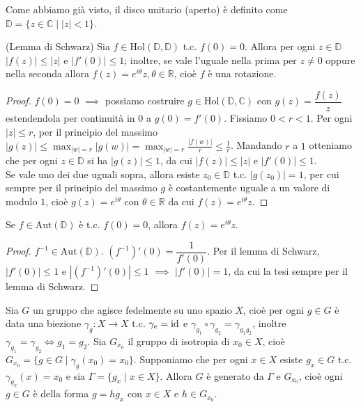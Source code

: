 Come abbiamo già visto, il disco unitario (aperto) è definito come $\mathbb{D}=\{z \in \mathbb{C} \mid |z|<1\}$.

\begin{lm}
  (Lemma di Schwarz) Sia $f \in \text{Hol}(\mathbb{D}, \mathbb{D})$ t.c. $f(0)=0$. Allora per ogni $z \in \mathbb{D}$ $|f(z)| \le |z|$ e $|f'(0)| \le 1$; inoltre, se vale l'uguale nella prima per $z \not=0$ oppure nella seconda allora $f(z)=e^{i\theta}z, \theta \in \mathbb{R}$, cioè $f$ è una rotazione.
\end{lm}

\begin{proof}
  $f(0)=0$ $\implies$ possiamo costruire $g \in \text{Hol}(\mathbb{D}, \mathbb{C})$ con $g(z)=\dfrac{f(z)}{z}$ estendendola per continuità in $0$ a $g(0)=f'(0)$. Fissiamo $0<r<1$.
  Per ogni $|z| \le r$, per il principio del massimo $\displaystyle |g(z)| \le \max_{|w|=r} |g(w)|=\max_{|w|=r} \frac{|f(w)|}{r} \le \frac{1}{r}$. Mandando $r$ a $1$ otteniamo che per ogni $z \in \mathbb{D}$ si ha $|g(z)| \le 1$, da cui $|f(z)|\le |z|$ e $|f'(0)| \le 1$. \\
  Se vale uno dei due uguali sopra, allora esiste $z_0 \in \mathbb{D}$ t.c. $|g(z_0)|=1$, per cui sempre per il principio del massimo $g$ è costantemente uguale a un valore di modulo $1$, cioè $g(z)=e^{i\theta}$ con $\theta \in \mathbb{R}$ da cui $f(z)=e^{i\theta}z$.
\end{proof}

\begin{cor}
  Se $f \in \text{Aut}(\mathbb{D})$ è t.c. $f(0)=0$, allora $f(z)=e^{i\theta}z$.
\end{cor}

\begin{proof}
  $f^{-1} \in \text{Aut}(\mathbb{D})$. $(f^{-1})'(0)=\dfrac{1}{f'(0)}$. Per il lemma di Schwarz, $|f'(0)| \le 1$ e $|(f^{-1})'(0)| \le 1$ $\implies$ $|f'(0)|=1$, da cui la tesi sempre per il lemma di Schwarz.
\end{proof}

\begin{lm} \label{az_gr}
  Sia $G$ un gruppo che agisce fedelmente su uno spazio $X$, cioè per ogni $g \in G$ è data una biezione $\gamma_g:X \rightarrow X$ t.c. $\gamma_{e}=\operatorname{id}$ e $\gamma_{g_1} \circ \gamma_{g_2} =\gamma_{g_1g_2}$, inoltre $\gamma_{g_1}=\gamma_{g_2} \iff g_1=g_2$.
  Sia $G_{x_0}$ il gruppo di isotropia di $x_0 \in X$, cioè $G_{x_0}=\{g \in G \mid \gamma_g(x_0)=x_0\}$. Supponiamo che per ogni $x \in X$ esiste $g_x \in G$ t.c. $\gamma_{g_x}(x)=x_0$ e sia $\Gamma=\{g_x \mid x \in X\}$.
  Allora $G$ è generato da $\Gamma$ e $G_{x_0}$, cioè ogni $g \in G$ è della forma $g=hg_x$ con $x \in X$ e $h \in G_{x_0}$.
\end{lm}

